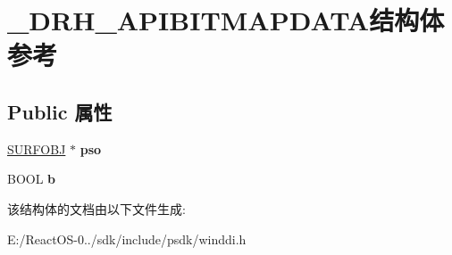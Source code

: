 \hypertarget{struct___d_r_h___a_p_i_b_i_t_m_a_p_d_a_t_a}{}\section{\+\_\+\+D\+R\+H\+\_\+\+A\+P\+I\+B\+I\+T\+M\+A\+P\+D\+A\+T\+A结构体 参考}
\label{struct___d_r_h___a_p_i_b_i_t_m_a_p_d_a_t_a}
\subsection*{Public 属性}
\begin{DoxyCompactItemize}
\item 
\mbox{\label{struct___d_r_h___a_p_i_b_i_t_m_a_p_d_a_t_a_abe5fa90880d3919a8252d32b3c53f9c6}} 
\hyperlink{struct___s_u_r_f_o_b_j}{S\+U\+R\+F\+O\+BJ} $\ast$ {\bfseries pso}
\item 
\mbox{\label{struct___d_r_h___a_p_i_b_i_t_m_a_p_d_a_t_a_a7fb586d6d8fa7472c08304490e955142}} 
B\+O\+OL {\bfseries b}
\end{DoxyCompactItemize}


该结构体的文档由以下文件生成\+:\begin{DoxyCompactItemize}
\item 
E\+:/\+React\+O\+S-\/0../sdk/include/psdk/winddi.\+h\end{DoxyCompactItemize}
